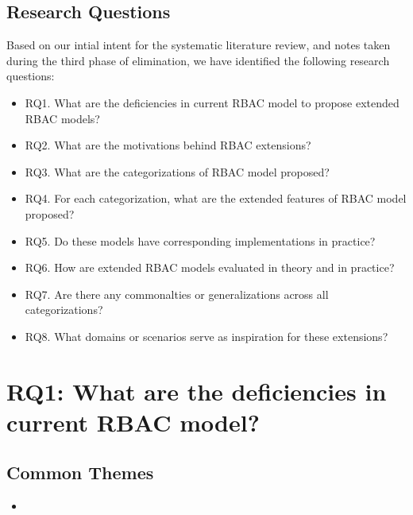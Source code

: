 \documentclass[letterpaper,10pt,english]{sphinxmanual}
\begin{document}
\section{Research Questions}
\label{process:research-questions}
Based on our intial intent for the systematic literature review, and notes taken during the third phase of elimination, we have identified the following research questions:
\begin{itemize}
\item {} 
RQ1. What are the deficiencies in current RBAC model to propose extended RBAC models?

\item {} 
RQ2. What are the motivations behind RBAC extensions?

\item {} 
RQ3. What are the categorizations of RBAC model proposed?

\item {} 
RQ4. For each categorization, what are the extended features of RBAC model proposed?

\item {} 
RQ5. Do these models have corresponding implementations in practice?

\item {} 
RQ6. How are extended RBAC models evaluated in theory and in practice?

\item {} 
RQ7. Are there any commonalties or generalizations across all categorizations?

\item {} 
RQ8. What domains or scenarios serve as inspiration for these extensions?

\end{itemize}


\chapter{RQ1: What are the deficiencies in current RBAC model?}
\label{research_questions/RQ_1:rq1-what-are-the-deficiencies-in-current-rbac-model}\label{research_questions/RQ_1::doc}

\section{Common Themes}
\label{research_questions/RQ_1:common-themes}\begin{itemize}
\item {} 
\end{itemize}
\end{document}
